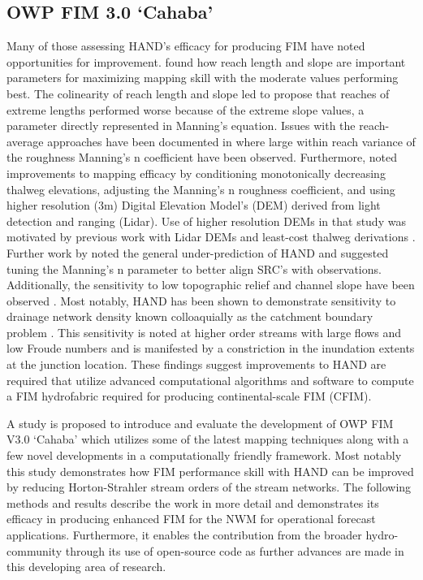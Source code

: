 \subsection{OWP FIM 3.0 `Cahaba'}
%
Many of those assessing HAND's efficacy for producing FIM have noted opportunities for improvement. 
 found how reach length and slope are important parameters for maximizing mapping skill with the moderate values performing best. 
The colinearity of reach length and slope led  to propose that reaches of extreme lengths performed worse because of the extreme slope values, a parameter directly represented in Manning's equation. 
Issues with the reach-average approaches have been documented in  where large within reach variance of the roughness Manning's n coefficient have been observed.
Furthermore,  noted improvements to mapping efficacy by conditioning monotonically decreasing thalweg elevations, adjusting the Manning's n roughness coefficient, and using higher resolution (3m) Digital Elevation Model's (DEM) derived from light detection and ranging (Lidar).
Use of higher resolution DEMs in that study was motivated by previous work with Lidar DEMs and least-cost thalweg derivations \cite{zheng2018geoflood}.
Further work by  noted the general under-prediction of HAND and suggested tuning the Manning's n parameter to better align SRC's with observations. 
Additionally, the sensitivity to low topographic relief and channel slope have been observed \cite{johnson2019integrated,godbout2019error}. 
Most notably, HAND has been shown to demonstrate sensitivity to drainage network density known colloaquially as the catchment boundary problem \cite{zhang2018comparative,mcgehee2016modified,li2020evaluation,nobre2016hand}.
This sensitivity is noted at higher order streams with large flows and low Froude numbers and is manifested by a constriction in the inundation extents at the junction location.
These findings suggest improvements to HAND are required that utilize advanced computational algorithms and software to compute a FIM hydrofabric required for producing continental-scale FIM (CFIM).

A study is proposed to introduce and evaluate the development of OWP FIM V3.0 `Cahaba' which utilizes some of the latest mapping techniques along with a few novel developments in a computationally friendly framework. 
Most notably this study demonstrates how FIM performance skill with HAND can be improved by reducing Horton-Strahler stream orders \cite{horton1945erosional,strahler1952hypsometric,strahler1952hypsometric} of the stream networks.
The following methods and results describe the work in more detail and demonstrates its efficacy in producing enhanced FIM for the NWM for operational forecast applications. 
Furthermore, it enables the contribution from the broader hydro-community through its use of open-source code as further advances are made in this developing area of research.
%
